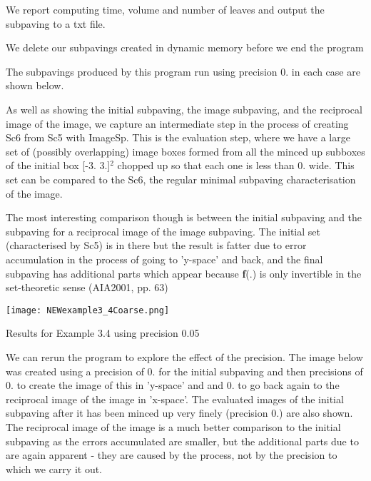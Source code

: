 \-We report computing time, volume and number of leaves and output the subpaving to a txt file.


\begin{DoxyCodeInclude}

\end{DoxyCodeInclude}


\-We delete our subpavings created in dynamic memory before we end the program


\begin{DoxyCodeInclude}

\end{DoxyCodeInclude}


\-The subpavings produced by this program run using precision 0. in each case are shown below.

\-As well as showing the initial subpaving, the image subpaving, and the reciprocal image of the image, we capture an intermediate step in the process of creating \-Sc6 from \-Sc5 with \-Image\-Sp. \-This is the evaluation step, where we have a large set of (possibly overlapping) image boxes formed from all the minced up subboxes of the initial box \mbox{[}-\/3. 3.\mbox{]}$^{\mbox{2}}$  chopped up so that each one is less than 0. wide. \-This set can be compared to the \-Sc6, the regular minimal subpaving characterisation of the image.

\-The most interesting comparison though is between the initial subpaving and the subpaving for a reciprocal image of the image subpaving. \-The initial set (characterised by \-Sc5) is in there but the result is fatter due to error accumulation in the process of going to 'y-\/space' and back, and the final subpaving has additional parts which appear because {\bfseries f}(.) is only invertible in the set-\/theoretic sense (\-A\-I\-A2001, pp. 63)

 
\begin{DoxyImage}
\texttt{[image: NEWexample3\_4Coarse.png]}
\caption{\-Results for \-Example 3.4 using precision 0.05}
\end{DoxyImage}


\-We can rerun the program to explore the effect of the precision. \-The image below was created using a precision of 0. for the initial subpaving and then precisions of 0. to create the image of this in 'y-\/space' and and 0. to go back again to the reciprocal image of the image in 'x-\/space'. \-The evaluated images of the initial subpaving after it has been minced up very finely (precision 0.) are also shown. \-The reciprocal image of the image is a much better comparison to the initial subpaving as the errors accumulated are smaller, but the additional parts due to are again apparent -\/ they are caused by the process, not by the precision to which we carry it out.

